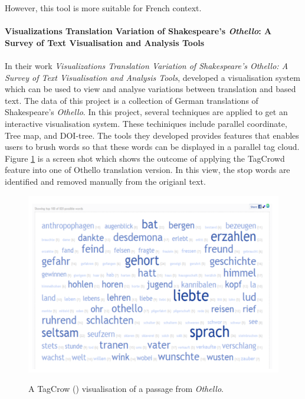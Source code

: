 However, this tool is more suitable for French context.

\paragraph{Visualizations Translation Variation of Shakespeare's \emph{Othello}: A Survey of Text Visualisation and Analysis Tools}
\paragraph[]{} In their work \emph{Visualizations Translation Variation of Shakespeare's Othello: A Survey of Text Visualisation and Analysis Tools}, \cite{Geng2011} developed a visualisation system which can be used to view and analyse variations between translation and based text. The data of this project is a collection of German translations of Shakespeare's \emph{Othello}. In this project, several techniques are applied to get an interactive visualisation system. These techiniques include parallel coordinate, Tree map, and DOI-tree. The tools they developed provides features that enables users to brush words so that these words can be displayed in  a parallel tag cloud. Figure \ref{fig:tagCloud} is a screen shot which shows the outcome of applying the TagCrowd feature into one of Othello translation version. In this view, the stop words are identified and removed manually from the origianl text.

\begin{figure}[H]
	\centering	
	\includegraphics[scale=1]{Figs/Tagcloud}\\[1ex]
	\caption{A TagCrow (\cite{TagCrowd}) visualisation of a passage from \emph{Othello}. }
	\label{fig:tagCloud}
\end{figure} 

